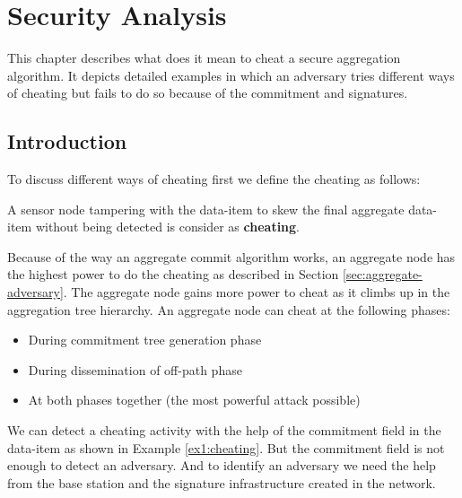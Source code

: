 \chapter{Security Analysis}
	
	This chapter describes what does it mean to cheat a secure aggregation algorithm.
	It depicts detailed examples in which an adversary tries different ways of cheating but fails to do so because of the commitment and signatures.

	\section{Introduction}
 	To discuss different ways of cheating first we define the cheating as follows:
	\begin{definition}
		A sensor node tampering with the data-item to skew the final aggregate data-item without being detected is consider as \textbf{cheating}.	
	\end{definition}
	Because of the way an aggregate commit algorithm works, an aggregate node has the highest power to do the cheating as described in Section \ref{sec:aggregate-adversary}. 
	The aggregate node gains more power to cheat as it climbs up in the aggregation tree hierarchy.
	An aggregate node can cheat at the following phases:
	\begin{itemize}
		\item During commitment tree generation phase
		\item During dissemination of off-path phase
		\item At both phases together (the most powerful attack possible) 
	\end{itemize}
	We can detect a cheating activity with the help of the commitment field in the data-item as shown in Example \ref{ex1:cheating}.
	But the commitment field is not enough to detect an adversary.
	And to identify an adversary we need the help from the base station and the signature infrastructure created in the network.


